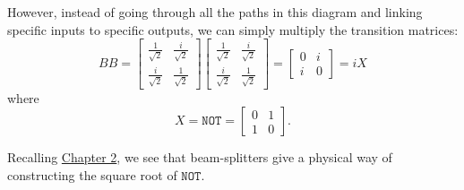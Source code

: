 \documentclass[fleqn]{article}
\begin{document}
However, instead of going through all the paths in this diagram and linking specific inputs to specific outputs, we can simply multiply the transition matrices:
\[
  BB =
  \begin{bmatrix}
    \frac{1}{\sqrt 2} & \frac{i}{\sqrt 2}\\
    \frac{i}{\sqrt 2} & \frac{1}{\sqrt 2}
  \end{bmatrix}
  \begin{bmatrix}
    \frac{1}{\sqrt 2} & \frac{i}{\sqrt 2}\\
    \frac{i}{\sqrt 2} & \frac{1}{\sqrt 2}
  \end{bmatrix}
  =
  \begin{bmatrix}
  0 & i\\
  i & 0
  \end{bmatrix}
  = iX
\]
where
\[
  X = \texttt{NOT} = \begin{bmatrix}0&1\\1&0\end{bmatrix}.
\]

Recalling \protect\hyperlink{chapter2}{Chapter 2}, we see that beam-splitters give a physical way of constructing the square root of \(\texttt{NOT}\).
\end{document}
